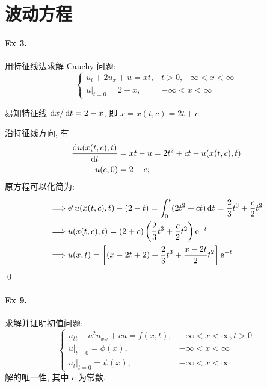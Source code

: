 \section{波动方程}
\paragraph{Ex 3.}
用特征线法求解 Cauchy 问题:
\[ \begin{cases}
u_t + 2u_x + u = xt, & t > 0, -\infty < x < \infty \\
u|_{t=0} = 2 - x, & -\infty < x < \infty
\end{cases} \]

\solution
易知特征线 $\operatorname{d\!} x /\operatorname{d\!} t = 2 - x$, 即 $x = x(t, c) = 2t + c$.

沿特征线方向, 有
\[ \begin{aligned}
\frac{\operatorname{d\!} u(x(t, c), t)}{\operatorname{d\!} t} &= xt - u = 2t^2 + ct - u(x(t, c), t) \\
u(c, 0) &= 2 - c;
\end{aligned} \]
原方程可以化简为:
\[ \begin{aligned}
\implies & {\mathrm e}^t u(x(t, c), t) - (2 - t) = \int_0^t (2t^2+ct)\operatorname{d\!} t =
  \frac23 t^3 + \frac{c}{2} t^2 \\
\implies & u(x(t,c),t) = (2+c)\left(\frac23 t^3+\frac{c}{2}t^2\right){\mathrm e}^{-t} \\
\implies & u(x,t) = \left[(x - 2t+ 2) + \frac23 t^3 + \frac{x-2t}{2}t^2 \right]
  {\mathrm e}^{-t} \\
\end{aligned} \]
\qed

\paragraph{Ex 9.}
求解并证明初值问题:
\[ \begin{cases}
u_{tt} - a^2 u_{xx} + cu = f(x, t), & -\infty < x < \infty, t > 0 \\
u|_{t=0} = \phi(x), & -\infty < x < \infty \\
u_t|_{t=0} = \psi(x), & -\infty < x < \infty
\end{cases} \]
解的唯一性, 其中 $c$ 为常数.


